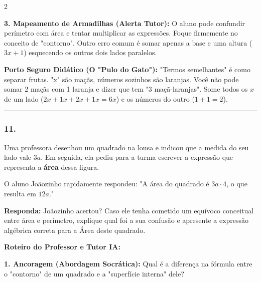 \begin{multicols*}{2}
\begin{tcolorbox}[colback=CorTitUm!5, colframe=CorTitUm, boxrule=1pt, arc=4pt, left=6pt, right=6pt, top=6pt, bottom=6pt]
    \textbf{3. Mapeamento de Armadilhas (Alerta Tutor):} O aluno pode confundir perímetro com área e tentar multiplicar as expressões. Foque firmemente no conceito de "contorno". Outro erro comum é somar apenas a base e uma altura ($3x+1$) esquecendo os outros dois lados paralelos.
    \end{tcolorbox}
    \vspace{0.15cm}
    
    \begin{boxexplicacao}
    \textbf{Porto Seguro Didático (O "Pulo do Gato"):} "Termos semelhantes" é como separar frutas. "x" são maçãs, números sozinhos são laranjas. Você não pode somar 2 maçãs com 1 laranja e dizer que tem "3 maçã-laranjas". Some todos os $x$ de um lado ($2x+1x+2x+1x = 6x$) e os números do outro ($1+1=2$).
    \end{boxexplicacao}
\fi

\par\vspace{\espacoQuestao}

\noindent\textcolor{CorLinha}{\rule{\linewidth}{0.5pt}}
\par\vspace{\espacoPreQuestao}
\subsubsection*{11.} 
\begin{enunciadoLiteral}
Uma professora desenhou um quadrado na lousa e indicou que a medida do seu lado vale $3a$. Em seguida, ela pediu para a turma escrever a expressão que representa a \textbf{área} dessa figura.

O aluno Joãozinho rapidamente respondeu: "A área do quadrado é $ 3a \cdot 4 $, o que resulta em $ 12a $."

\begin{boxresponda}
\textbf{Responda:} Joãozinho acertou? Caso ele tenha cometido um equívoco conceitual entre área e perímetro, explique qual foi a sua confusão e apresente a expressão algébrica correta para a Área deste quadrado.
\end{boxresponda}
\end{enunciadoLiteral}

\ifgabarito
    \begin{tcolorbox}[colback=CorTitUm!5, colframe=CorTitUm, boxrule=1pt, arc=4pt, left=6pt, right=6pt, top=6pt, bottom=6pt]
    \small\textbf{\textcolor{CorTitUm}{Roteiro do Professor e Tutor IA:}}\par\vspace{0.1cm}
    \color{CinzaEscuro}
    \textbf{1. Ancoragem (Abordagem Socrática):} Qual é a diferença na fórmula entre o "contorno" de um quadrado e a "superfície interna" dele?\par\vspace{0.1cm}
    

\end{tcolorbox}
\end{multicols*}
